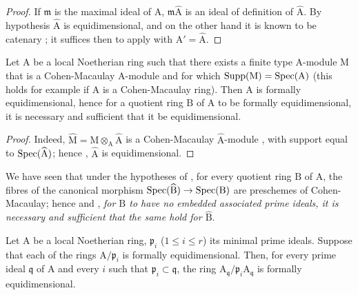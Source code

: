 \begin{proof}
If $\mathfrak{m}$ is the maximal ideal of $\mathrm{A}$, $\mathfrak{m}\widehat{\mathrm{A}}$ is an ideal of definition of $\widehat{\mathrm{A}}$.
By hypothesis $\widehat{\mathrm{A}}$ is equidimensional, and on the other hand it is known to be catenary ; it suffices then to apply  with $\mathrm{A}'=\widehat{\mathrm{A}}$.
\end{proof}

\begin{corollary}[7.1.5]
\label{IV.7.1.5}
Let $\mathrm{A}$ be a local Noetherian ring such that there exists a finite type $\mathrm{A}$-module $\mathrm{M}$ that is a Cohen-Macaulay $\mathrm{A}$-module and for which $\operatorname{Supp}(\mathrm{M})=\operatorname{Spec}(\mathrm{A})$ (this holds for example if $\mathrm{A}$ is a Cohen-Macaulay ring).
Then $\mathrm{A}$ is formally equidimensional, hence  for a quotient ring $\mathrm{B}$ of $\mathrm{A}$ to be formally equidimensional, it is necessary and sufficient that it be equidimensional.
\end{corollary}

\begin{proof}
Indeed, $\widehat{\mathrm{M}}=\mathrm{M}\otimes_\mathrm{A}\widehat{\mathrm{A}}$ is a Cohen-Macaulay $\widehat{\mathrm{A}}$-module , with support equal to $\operatorname{Spec}(\widehat{\mathrm{A}})$; hence , $\widehat{\mathrm{A}}$ is equidimensional.
\end{proof}

\begin{remark}[7.1.6]
\label{IV.7.1.6}
We have seen  that under the hypotheses of , for every quotient ring $\mathrm{B}$ of $\mathrm{A}$, the fibres of the canonical morphism $\operatorname{Spec}(\widehat{\mathrm{B}})\to\operatorname{Spec}(\mathrm{B})$ are preschemes of Cohen-Macaulay; hence  and , \emph{for $\mathrm{B}$ to have no embedded associated prime ideals, it is necessary and sufficient that the same hold for $\widehat{\mathrm{B}}$}.
\end{remark}

\begin{lemma}[7.1.7]
\label{IV.7.1.7}
Let $\mathrm{A}$ be a local Noetherian ring, $\mathfrak{p}_i$ ($1\leqslant i\leqslant r$) its minimal prime ideals.
Suppose that each of the rings $\mathrm{A}/\mathfrak{p}_i$ is formally equidimensional.
Then, for every prime ideal $\mathfrak{q}$ of $\mathrm{A}$ and every $i$ such that $\mathfrak{p}_i\subset\mathfrak{q}$, the ring $\mathrm{A}_\mathfrak{q}/\mathfrak{p}_i\mathrm{A}_\mathfrak{q}$ is formally equidimensional.
\end{lemma}

